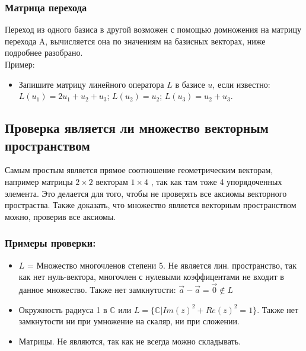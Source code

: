 \documentclass[12pt]{article}
\begin{document}
\subsubsection{Матрица перехода}
Переход из одного базиса в другой возможен с помощью домножения на матрицу перехода A, вычисляется она по значениям на базисных векторах, ниже подробнее разобрано.\\
Пример:
\begin{itemize}
    \item {Запишите матрицу линейного оператора $L$ в базисе $u$, если известно: $L(u_1) = 2u_1 + u_2 + u_3$; $L(u_2) = u_2$;
          $L(u_3) = u_2 + u_3$.}


\end{itemize}

\subsection{Проверка является ли множество векторным пространством}
Самым простым является прямое соотношение геометрическим векторам, например матрицы $2\times 2$ векторам $1\times 4$ , так как там тоже 4 упорядоченных элемента. Это делается для того, чтобы не проверять все аксиомы векторного простраства. Также доказать, что множество является векторным пространством можно, проверив все аксиомы.
\subsubsection{Примеры проверки:}
\begin{itemize}
    \item $L$ = \textbraceleft Множество многочленов степени 5\textbraceright . Не является лин. пространство, так как нет нуль-вектора, многочлен с нулевыми коэффицентами не входит в данное множество. Также нет замкнутости: $\overrightarrow{a}-\overrightarrow{a}=\overrightarrow{0} \notin L $
    \item Окружность радиуса 1 в $\mathbb{C}$ или $L = \{ \mathbb{C}  \vert  Im(z)^2+Re(z)^2 = 1 \} $. Также нет замкнутости ни при умножение на скаляр, ни при сложении.
    \item Матрицы. Не являются, так как не всегда можно складывать.

\end{itemize}
\end{document}
